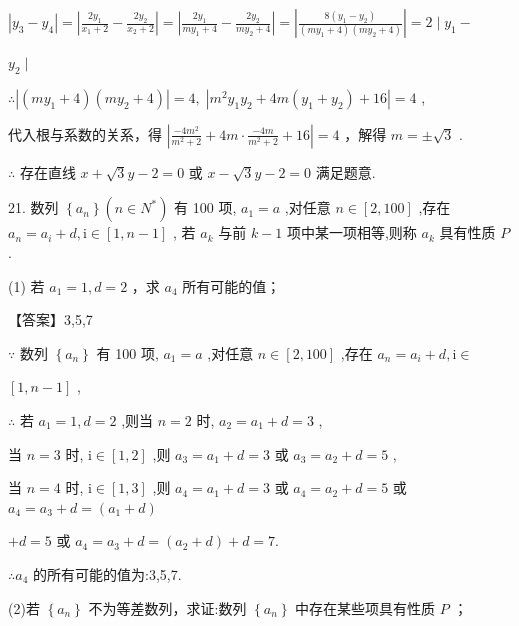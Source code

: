 \documentclass[10pt]{article}
\begin{document}
\(\left| {{y}_{3} - {y}_{4}}\right|  = \left| {\frac{2{y}_{1}}{{x}_{1} + 2} - \frac{2{y}_{2}}{{x}_{2} + 2}}\right|  = \left| {\frac{2{y}_{1}}{m{y}_{1} + 4} - \frac{2{y}_{2}}{m{y}_{2} + 4}}\right|  = \left| \frac{8\left( {{y}_{1} - {y}_{2}}\right) }{\left( {m{y}_{1} + 4}\right) \left( {m{y}_{2} + 4}\right) }\right|  = 2 \mid  {y}_{1} -\)

\({y}_{2} \mid\)

\(\therefore \left| {\left( {m{y}_{1} + 4}\right) \left( {m{y}_{2} + 4}\right) }\right|  = 4,\;\left| {{m}^{2}{y}_{1}{y}_{2} + {4m}\left( {{y}_{1} + {y}_{2}}\right)  + {16}}\right|  = 4\) ,

代入根与系数的关系，得 \(\left| {\frac{-4{m}^{2}}{{m}^{2} + 2} + {4m} \cdot  \frac{-{4m}}{{m}^{2} + 2} + {16}}\right|  = 4\) ，解得 \(m =  \pm  \sqrt{3}\) .

\(\therefore\) 存在直线 \(x + \sqrt{3}y - 2 = 0\) 或 \(x - \sqrt{3}y - 2 = 0\) 满足题意.

21. 数列 \(\left\{  {a}_{n}\right\}  \left( {n \in  {N}^{ * }}\right)\) 有 100 项, \({a}_{1} = a\) ,对任意 \(n \in  \left\lbrack  {2,{100}}\right\rbrack\) ,存在 \({a}_{n} = {a}_{i} + d,\mathrm{i} \in  \left\lbrack  {1,n - 1}\right\rbrack\) , 若 \({a}_{k}\) 与前 \(k - 1\) 项中某一项相等,则称 \({a}_{k}\) 具有性质 \(P\) .

(1) 若 \({a}_{1} = 1,d = 2\) ，求 \({a}_{4}\) 所有可能的值；

【答案】3,5,7

\(\because\) 数列 \(\left\{  {a}_{n}\right\}\) 有 100 项, \({a}_{1} = a\) ,对任意 \(n \in  \left\lbrack  {2,{100}}\right\rbrack\) ,存在 \({a}_{n} = {a}_{i} + d,\mathrm{i} \in\)

\(\left\lbrack  {1,n - 1}\right\rbrack\) ,

\(\therefore\) 若 \({a}_{1} = 1,d = 2\) ,则当 \(n = 2\) 时, \({a}_{2} = {a}_{1} + d = 3\) ,

当 \(n = 3\) 时, \(\mathrm{i} \in  \left\lbrack  {1,2}\right\rbrack\) ,则 \({a}_{3} = {a}_{1} + d = 3\) 或 \({a}_{3} = {a}_{2} + d = 5\) ,

当 \(n = 4\) 时, \(\mathrm{i} \in  \left\lbrack  {1,3}\right\rbrack\) ,则 \({a}_{4} = {a}_{1} + d = 3\) 或 \({a}_{4} = {a}_{2} + d = 5\) 或 \({a}_{4} = {a}_{3} + d = \left( {{a}_{1} + d}\right)\)

\(+ d = 5\) 或 \({a}_{4} = {a}_{3} + d = \left( {{a}_{2} + d}\right)  + d = 7.\)

\(\therefore {a}_{4}\) 的所有可能的值为:3,5,7.

(2)若 \(\left\{  {a}_{n}\right\}\) 不为等差数列，求证:数列 \(\left\{  {a}_{n}\right\}\) 中存在某些项具有性质 \(P\) ；
\end{document}
